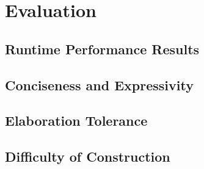 \chapter{Evaluation}

%
%
%
%
%
%

\section{Runtime Performance Results}

\section{Conciseness and Expressivity}

\section{Elaboration Tolerance}

\section{Difficulty of Construction}
